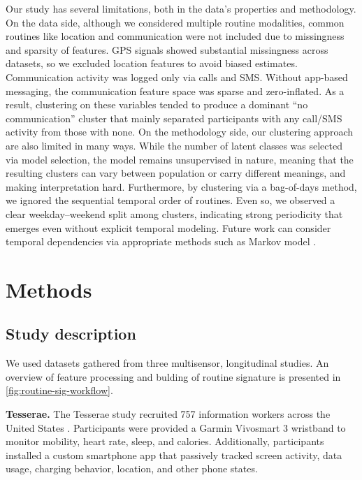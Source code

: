 \documentclass[pdflatex,sn-vancouver,Numbered]{bst/sn-jnl}%
\theoremstyle{thmstyleone}%
\theoremstyle{thmstyletwo}%
\theoremstyle{thmstylethree}%
\begin{document}
Our study has several limitations, both in the data's properties and methodology. On the data side, although we considered multiple routine modalities, common routines like location and communication were not included due to missingness and sparsity of features. GPS signals showed substantial missingness across datasets, so we excluded location features to avoid biased estimates. Communication activity was logged only via calls and SMS. Without app-based messaging, the communication feature space was sparse and zero-inflated. As a result, clustering on these variables tended to produce a dominant “no communication” cluster that mainly separated participants with any call/SMS activity from those with none. On the methodology side, our clustering approach are also limited in many ways. While the number of latent classes was selected via model selection, the model remains unsupervised in nature, meaning that the resulting clusters can vary between population or carry different meanings, and making interpretation hard. Furthermore, by clustering via a bag-of-days method, we ignored the sequential temporal order of routines. Even so, we observed a clear weekday–weekend split among clusters, indicating strong periodicity that emerges even without explicit temporal modeling. Future work can consider temporal dependencies via appropriate methods such as Markov model \cite{liuIntraindividualPhenotypingDepression2024, leaningUncoveringSocialStates2025}.

\section*{Methods}\label{sec:methods}  

\subsection*{Study description}\label{sec:methods:study_desc}  

We used datasets gathered from three multisensor, longitudinal studies. An overview of feature processing and bulding of routine signature is presented in \autoref{fig:routine-sig-workflow}.

\textbf{Tesserae.} The Tesserae study recruited 757 information workers across the United States \cite{mattingly2019tesserae}. Participants were provided a Garmin Vivosmart 3 wristband to monitor mobility, heart rate, sleep, and calories. Additionally, participants installed a custom smartphone app that passively tracked screen activity, data usage, charging behavior, location, and other phone states.
\end{document}
